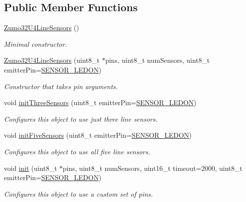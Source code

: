 \subsection*{Public Member Functions}
\begin{DoxyCompactItemize}
\item 
\hyperlink{class_zumo32_u4_line_sensors_af1e61e6f4e14544054712689d23a974d}{Zumo32\+U4\+Line\+Sensors} ()
\begin{DoxyCompactList}\small\item\em Minimal constructor. \end{DoxyCompactList}\item 
\hyperlink{class_zumo32_u4_line_sensors_a59ecf283662fbcb2993d74fd436b0e53}{Zumo32\+U4\+Line\+Sensors} (uint8\+\_\+t $\ast$pins, uint8\+\_\+t num\+Sensors, uint8\+\_\+t emitter\+Pin=\hyperlink{_zumo32_u4_line_sensors_8h_a661904c7fa6e0b2cb9645e2ef272cfcd}{S\+E\+N\+S\+O\+R\+\_\+\+L\+E\+D\+ON})
\begin{DoxyCompactList}\small\item\em Constructor that takes pin arguments. \end{DoxyCompactList}\item 
void \hyperlink{class_zumo32_u4_line_sensors_a880737a0df457e9acf3277b2342e4087}{init\+Three\+Sensors} (uint8\+\_\+t emitter\+Pin=\hyperlink{_zumo32_u4_line_sensors_8h_a661904c7fa6e0b2cb9645e2ef272cfcd}{S\+E\+N\+S\+O\+R\+\_\+\+L\+E\+D\+ON})
\begin{DoxyCompactList}\small\item\em Configures this object to use just three line sensors. \end{DoxyCompactList}\item 
void \hyperlink{class_zumo32_u4_line_sensors_a3873997ed35fbc1c6c57411f6cee1f2d}{init\+Five\+Sensors} (uint8\+\_\+t emitter\+Pin=\hyperlink{_zumo32_u4_line_sensors_8h_a661904c7fa6e0b2cb9645e2ef272cfcd}{S\+E\+N\+S\+O\+R\+\_\+\+L\+E\+D\+ON})
\begin{DoxyCompactList}\small\item\em Configures this object to use all five line sensors. \end{DoxyCompactList}\item 
void \hyperlink{class_zumo32_u4_line_sensors_aa8656b7a8c3d27302d76431acb93c2ac}{init} (uint8\+\_\+t $\ast$pins, uint8\+\_\+t num\+Sensors, uint16\+\_\+t timeout=2000, uint8\+\_\+t emitter\+Pin=\hyperlink{_zumo32_u4_line_sensors_8h_a661904c7fa6e0b2cb9645e2ef272cfcd}{S\+E\+N\+S\+O\+R\+\_\+\+L\+E\+D\+ON})
\begin{DoxyCompactList}\small\item\em Configures this object to use a custom set of pins. \end{DoxyCompactList}\item 

\end{DoxyCompactItemize}
